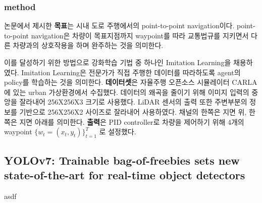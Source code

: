 \subsubsection{method}{\label{subsubsec:tf_method}}
논문에서 제시한 \textbf{목표}는 시내 도로 주행에서의 point-to-point navigation이다.
point-to-point navigation은 차량이 목표지점까지
waypoint를 따라
교통법규를 지키면서
다른 차량과의 상호작용을 하며
완주하는 것을 의미한다.

이를 달성하기 위한 방법으로 강화학습 기법 중 하나인 Imitation Learning을 채용하였다.
Imitation Learning은 전문가가 직접 주행한 데이터를 따라하도록 agent의 policy를 학습하는 것을 의미한다.
\textbf{데이터셋}은 자율주행 오픈소스 시뮬레이터 CARLA\cite{CARLA}에 있는 urban 가상환경에서 수집했다.
데이터의 왜곡을 줄이기 위해 이미지 입력의 중앙을 잘라내어 256X256X3 크기로 사용했다.
LiDAR 센서의 출력 또한 주변부분의 정보를 기반으로 256X256X2 사이즈로 잘라내어 사용하였다.
채널의 한쪽은 지면 위, 한쪽은 지면 아래를 의미한다.
\textbf{출력}은 PID controller로 차량을 제어하기 위해 4개의 waypoint $\{w_t = (x_t, y_t)\}_{t=1}^T$ 로 설정했다.



\subsection{YOLOv7: Trainable bag-of-freebies sets new state-of-the-art for real-time object detectors}{\label{subsec:yolov7}}

asdf